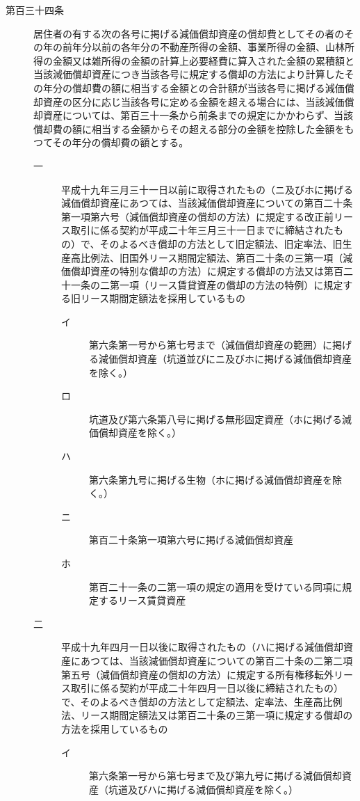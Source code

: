 \documentclass[twocolumn,a4j,10pt]{ltjtarticle}
\begin{document}
\begin{description}
\item[第百三十四条]居住者の有する次の各号に掲げる減価償却資産の償却費としてその者のその年の前年分以前の各年分の不動産所得の金額、事業所得の金額、山林所得の金額又は雑所得の金額の計算上必要経費に算入された金額の累積額と当該減価償却資産につき当該各号に規定する償却の方法により計算したその年分の償却費の額に相当する金額との合計額が当該各号に掲げる減価償却資産の区分に応じ当該各号に定める金額を超える場合には、当該減価償却資産については、第百三十一条から前条までの規定にかかわらず、当該償却費の額に相当する金額からその超える部分の金額を控除した金額をもつてその年分の償却費の額とする。
\begin{description}
\item[一]平成十九年三月三十一日以前に取得されたもの（ニ及びホに掲げる減価償却資産にあつては、当該減価償却資産についての第百二十条第一項第六号（減価償却資産の償却の方法）に規定する改正前リース取引に係る契約が平成二十年三月三十一日までに締結されたもの）で、そのよるべき償却の方法として旧定額法、旧定率法、旧生産高比例法、旧国外リース期間定額法、第百二十条の三第一項（減価償却資産の特別な償却の方法）に規定する償却の方法又は第百二十一条の二第一項（リース賃貸資産の償却の方法の特例）に規定する旧リース期間定額法を採用しているもの
\begin{description}
\item[イ]第六条第一号から第七号まで（減価償却資産の範囲）に掲げる減価償却資産（坑道並びにニ及びホに掲げる減価償却資産を除く。）
\item[ロ]坑道及び第六条第八号に掲げる無形固定資産（ホに掲げる減価償却資産を除く。）
\item[ハ]第六条第九号に掲げる生物（ホに掲げる減価償却資産を除く。）
\item[ニ]第百二十条第一項第六号に掲げる減価償却資産
\item[ホ]第百二十一条の二第一項の規定の適用を受けている同項に規定するリース賃貸資産
\end{description}
\item[二]平成十九年四月一日以後に取得されたもの（ハに掲げる減価償却資産にあつては、当該減価償却資産についての第百二十条の二第二項第五号（減価償却資産の償却の方法）に規定する所有権移転外リース取引に係る契約が平成二十年四月一日以後に締結されたもの）で、そのよるべき償却の方法として定額法、定率法、生産高比例法、リース期間定額法又は第百二十条の三第一項に規定する償却の方法を採用しているもの
\begin{description}
\item[イ]第六条第一号から第七号まで及び第九号に掲げる減価償却資産（坑道及びハに掲げる減価償却資産を除く。）

\end{description}
\end{description}
\end{description}
\end{document}
